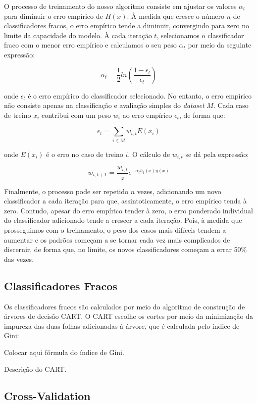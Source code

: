 \documentclass{article}
\begin{document}
O processo de treinamento do nosso algoritmo consiste em ajustar os valores $ \alpha_t $ para 
diminuir o erro empírico de $ H(x) $. À medida que cresce o número $ n $ de classificadores fracos,
o erro empírico tende a diminuir, convergindo para zero no limite da capacidade do modelo. À
cada iteração $ t $, selecionamos o classificador fraco com o menor erro empírico e 
calculamos o seu peso $ \alpha_t $ por meio da seguinte expressão:

\[
\alpha_t = \frac{1}{2} ln\left(\frac{1 - \epsilon_t}{\epsilon_t}\right)
\]

onde $ \epsilon_t $ é o erro empírico do classificador selecionado. No entanto, o erro empírico não
consiste apenas na classificação e avaliação simples do \textit{dataset} $ M $. Cada caso de treino 
$ x_i $ contribui com um peso $ w_i $ ao erro empírico $ \epsilon_t $, de forma que:

\[
\epsilon_t = \sum_{i \in M} w_{i,t} E(x_i)
\]

onde $ E(x_i) $ é o erro no caso de treino $ i $. O cálculo de $ w_{i,t} $ se dá pela expressão:

\[
w_{i,t+1} = \frac{w_{i,t}}{z} e^{-\alpha_t h_t(x) y(x)}
\]

Finalmente, o processo pode ser repetido $ n $ vezes, adicionando um novo classificador a cada iteração
para que, assintoticamente, o erro empírico tenda à zero. Contudo, apesar do erro empírico tender à
zero, o erro ponderado individual do classificador adicionado tende a crescer a cada iteração. Pois,
à medida que prosseguimos com o treinamento, o peso dos casos mais difíceis tendem a aumentar
e os padrões começam a se tornar cada vez mais complicados de discernir, de forma que, no limite,
os novos classificadores começam a errar 50\% das vezes.

\subsection{Classificadores Fracos}

Os classificadores fracos são calculados por meio do algoritmo de construção de árvores 
de decisão CART. O CART escolhe os cortes por meio da minimização da impureza das
duas folhas adicionadas à árvore, que é calculada pelo índice de Gini:

Colocar aqui fórmula do índice de Gini.

Descrição do CART.

\subsection{Cross-Validation}
\end{document}
